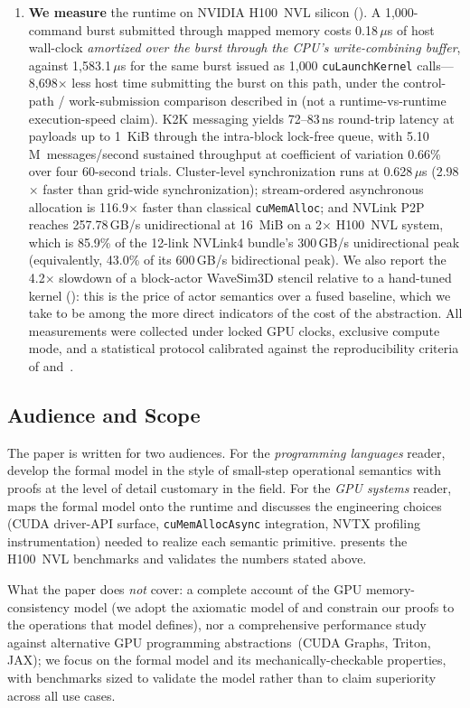 \begin{enumerate}
\item \textbf{We measure} the runtime on NVIDIA H100~NVL silicon
().  A 1{,}000-command burst submitted
through mapped memory costs 0.18\,\(\mu\)s of host wall-clock
\emph{amortized over the burst through the CPU's write-combining
buffer}, against 1{,}583.1\,\(\mu\)s for the same burst issued as
1{,}000 \texttt{cuLaunchKernel} calls---8{,}698\(\times\) less
host time submitting the burst on this path, under the control-path
/ work-submission comparison described in 
(not a runtime-vs-runtime execution-speed claim).  K2K messaging yields
72--83\,ns round-trip latency at payloads up to 1~KiB through the
intra-block lock-free queue, with 5.10\,M~messages/second
sustained throughput at coefficient of variation 0.66\% over four
60-second trials.  Cluster-level synchronization runs at
0.628\,\(\mu\)s (2.98\(\times\) faster than grid-wide
synchronization); stream-ordered asynchronous allocation is
116.9\(\times\) faster than classical \texttt{cuMemAlloc}; and
NVLink P2P reaches 257.78\,GB/s unidirectional at 16~MiB on a
2\(\times\) H100~NVL system, which is 85.9\% of the 12-link
NVLink4 bundle's 300\,GB/s unidirectional peak (equivalently,
43.0\% of its 600\,GB/s bidirectional peak).
We also report the 4.2\(\times\) slowdown of a block-actor
WaveSim3D stencil relative to a hand-tuned kernel
(): this is the price of actor semantics over a
fused baseline, which we take to be among the more direct
indicators of the cost of the abstraction.  All measurements were collected under locked
GPU clocks, exclusive compute mode, and a statistical protocol
calibrated against the reproducibility criteria of
\citet{georges2007rigorous} and~\citet{hoefler2015scientific}.
\end{enumerate}

\subsection{Audience and Scope}

The paper is written for two audiences.  For the \emph{programming
languages} reader, 
develop the formal model in the style of small-step operational
semantics with proofs at the level of detail customary in the
field.  For the \emph{GPU systems} reader, 
maps the formal model onto the \system{} runtime and discusses the
engineering choices (CUDA driver-API surface, \texttt{cuMemAllocAsync}
integration, NVTX profiling instrumentation) needed to realize each
semantic primitive.   presents the
H100~NVL benchmarks and validates the numbers stated above.

What the paper does \emph{not} cover: a complete account of the
GPU memory-consistency model (we adopt the axiomatic model of
\citet{lustig2014abstraction} and constrain our proofs to the
operations that model defines), nor a comprehensive performance
study against alternative GPU programming
abstractions~(CUDA Graphs, Triton, JAX); we focus on the
formal model and its mechanically-checkable properties, with
benchmarks sized to validate the model rather than to claim
superiority across all use cases.
